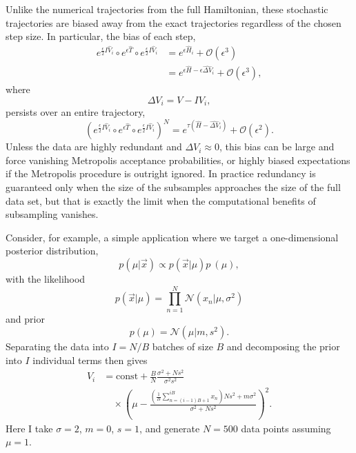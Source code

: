 \documentclass{article}
\begin{document}
Unlike the numerical trajectories from the full Hamiltonian, these stochastic 
trajectories are biased away from the exact trajectories regardless of the
chosen step size.  In particular, the bias of each step,
%
\begin{align*}
e^{\frac{\epsilon}{2} I \hat{V}_{i} } \circ 
e^{\epsilon \hat{T} } \circ 
e^{\frac{\epsilon}{2} I \hat{V}_{i} }
&=
e^{ \epsilon \hat{H}_{i} }
+ \mathcal{O} \! \left( \epsilon^{3} \right)
\\
&=
e^{ \epsilon \hat{H} - \epsilon \widehat{ \Delta V}_{i} }
+ \mathcal{O} \! \left( \epsilon^{3} \right),
\end{align*}
%
where
%
\begin{equation*}
\Delta V_{i} = V - I V_{i},
\end{equation*}
%
persists over an entire trajectory,
%
\begin{equation*}
\left( e^{\frac{\epsilon}{2} I \hat{V}_{i} } \circ 
e^{\epsilon \hat{T} } \circ 
e^{\frac{\epsilon}{2} I \hat{V}_{i} } \right)^{N}
=
e^{ \tau \left( \hat{H} - \widehat{ \Delta V}_{i} \right) }
+ \mathcal{O} \! \left( \epsilon^{2} \right).
\end{equation*}
%
Unless the data are highly redundant and $\Delta V_{i} \approx 0$,
this bias can be large and force vanishing Metropolis acceptance probabilities,
or highly biased expectations if the Metropolis procedure is outright ignored.  
In practice redundancy is guaranteed only when the size of the subsamples
approaches the size of the full data set, but that is exactly the limit when the
computational benefits of subsampling vanishes.

Consider, for example, a simple application where we target a one-dimensional
posterior distribution,
%
\begin{equation} \label{posterior}
p \! \left( \mu | \vec{x} \right) \propto p \! \left( \vec{x} | \mu \right) p\ \! \left( \mu \right),
\end{equation}
%
with the likelihood
%
\begin{equation*}
p \! \left( \vec{x} | \mu \right) = \prod_{n = 1}^{N} \mathcal{N} \! \left( x_{n} | \mu, \sigma^{2} \right)
\end{equation*}
%
and prior
%
\begin{equation*}
p \! \left( \mu \right) = \mathcal{N} \! \left( \mu | m, s^{2} \right). 
\end{equation*}
%
Separating the data into $I = N / B$ batches of size $B$ and decomposing the
prior into $I$ individual terms then gives
%
\begin{align*}
V_{i} &= \mathrm{const} + 
\frac{B}{N} \frac{ \sigma^{2} + N s^{2}  }{ \sigma^{2} s^{2} }
\\
& \quad
\times \left( \mu - 
\frac{ \left( \frac{1}{B} \sum_{n = (i - 1) B + 1}^{i B} x_{n} \right) N s^{2}  + m \sigma^{2} }
{ \sigma^{2} + N s^{2} } 
\right)^{2}.
\end{align*}
%
Here I take $\sigma = 2$, $m = 0$, $s = 1$, and generate $N = 500$ data points
assuming $\mu = 1$.
\end{document}
